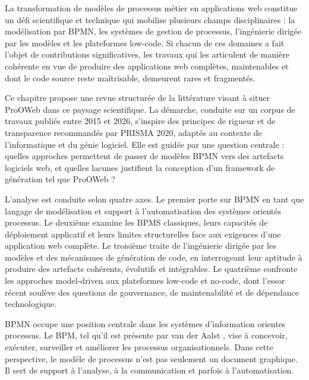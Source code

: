 \label{chap:revue-litterature-prooweb}


La transformation de modèles de processus métier en applications web constitue un défi scientifique et technique qui mobilise plusieurs champs disciplinaires : la modélisation par BPMN, les systèmes de gestion de processus, l'ingénierie dirigée par les modèles et les plateformes low-code. Si chacun de ces domaines a fait l'objet de contributions significatives, les travaux qui les articulent de manière cohérente en vue de produire des applications web complètes, maintenables et dont le code source reste maîtrisable, demeurent rares et fragmentés.

Ce chapitre propose une revue structurée de la littérature visant à situer ProOWeb dans ce paysage scientifique. La démarche, conduite sur un corpus de travaux publiés entre 2015 et 2026, s'inspire des principes de rigueur et de transparence recommandés par PRISMA 2020, adaptés au contexte de l'informatique et du génie logiciel. Elle est guidée par une question centrale : quelles approches permettent de passer de modèles BPMN vers des artefacts logiciels web, et quelles lacunes justifient la conception d'un framework de génération tel que ProOWeb ?

L'analyse est conduite selon quatre axes. Le premier porte sur BPMN en tant que langage de modélisation et support à l'automatisation des systèmes orientés processus. Le deuxième examine les BPMS classiques, leurs capacités de déploiement applicatif et leurs limites structurelles face aux exigences d'une application web complète. Le troisième traite de l'ingénierie dirigée par les modèles et des mécanismes de génération de code, en interrogeant leur aptitude à produire des artefacts cohérents, évolutifs et intégrables. Le quatrième confronte les approches model-driven aux plateformes low-code et no-code, dont l'essor récent soulève des questions de gouvernance, de maintenabilité et de dépendance technologique.


BPMN occupe une position centrale dans les systèmes d'information orientes processus. Le BPM, tel qu'il est présente par van der Aalst \cite{aalst2013}, vise à concevoir, exécuter, surveiller et améliorer les processus organisationnels. Dans cette perspective, le modèle de processus n'est pas seulement un document graphique. Il sert de support à l'analyse, à la communication et parfois à l'automatisation.

